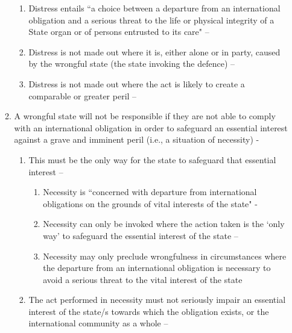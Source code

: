 \begin{enumerate}
\begin{enumerate}
        \begin{enumerate}
            \item Distress entails ``a choice between a departure from an international obligation and a serious threat to the life or physical integrity of a State organ or of persons entrusted to its care" -- 
            \item Distress is not made out where it is, either alone or in party, caused by the wrongful state (the state invoking the defence) -- 
            \item Distress is not made out where the act is likely to create a comparable or greater peril -- 
        \end{enumerate}
        \item A wrongful state will not be responsible if they are not able to comply with an international obligation in order to safeguard an essential interest against a grave and imminent peril (i.e., a situation of necessity) -
        \begin{enumerate}
            \item This must be the only way for the state to safeguard that essential interest -- 
            \begin{enumerate}
                \item Necessity is ``concerned with departure from international obligations on the grounds of vital interests of the state" - 
                \item Necessity can only be invoked where the action taken is the `only way' to safeguard the essential interest of the state -- 
                \item Necessity may only preclude wrongfulness in circumstances where the departure from an international obligation is necessary to avoid a serious threat to the vital interest of the state
            \end{enumerate}
            \item The act performed in necessity must not seriously impair an essential interest of the state/s towards which the obligation exists, or the international community as a whole -- 

\end{enumerate}
\end{enumerate}
\end{enumerate}

